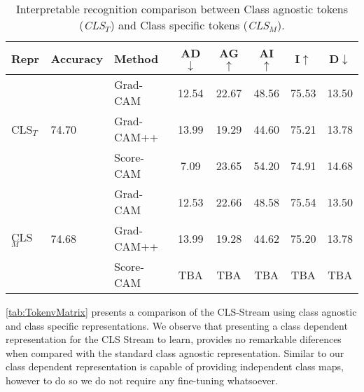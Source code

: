     \begin{table}[H]
        \centering
        \scriptsize
        \setlength{\tabcolsep}{2.5pt}
        \begin{tabular}{lllccccc}\toprule                    
            Repr&Accuracy&Method&AD$\downarrow$&AG$\uparrow$&AI$\uparrow$&I$\uparrow$&D$\downarrow$\\\midrule
            \multirow{3}{*}{CLS$_T$}&\multirow{3}{*}{74.70}&Grad-CAM&12.54&22.67&48.56&75.53&13.50\\
             & &Grad-CAM++&13.99&19.29&44.60&75.21&13.78\\
             & &Score-CAM&7.09&23.65&54.20&74.91&14.68\\\midrule
             \multirow{3}{*}{CLS$_M$}&\multirow{3}{*}{74.68}&Grad-CAM&12.53&22.66&48.58&75.54&13.50\\
             & &Grad-CAM++&13.99&19.28&44.62&75.20&13.78\\
             & &Score-CAM&TBA&TBA&TBA&TBA&TBA\\\bottomrule
        \end{tabular}
        \caption{Interpretable recognition comparison between Class agnostic tokens (\emph{CLS$_T$}) and Class specific tokens (\emph{CLS$_M$}).}
        \label{tab:TokenvMatrix}

    \end{table}

    \autoref{tab:TokenvMatrix} presents a comparison of the CLS-Stream using class agnostic and class specific representations. We observe that presenting a class dependent representation for the CLS Stream to learn, provides no remarkable diferences when compared with the standard class agnostic representation. Similar to \cite{touvron2021augmenting} our class dependent representation is capable of providing independent class maps, however to do so we do not require any fine-tuning whatsoever. 

